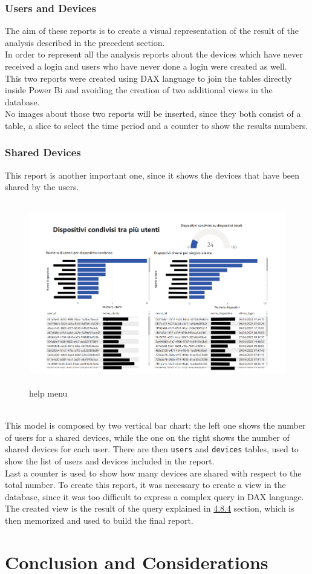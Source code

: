 \documentclass[12pt, a4paper, oneside]{article}
\begin{document}
\subsubsection{Users and Devices}
The aim of these reports is to create a visual representation of the result of the analysis described in the precedent section. \\
In order to represent all the analysis reports about the devices which have never received a login and users who have never done a login were created as well.\\
This two reports were created using DAX language to join the tables directly inside Power Bi and avoiding the creation of two additional views in the database.\\
No images about those two reports will be inserted, since they both consist of a table, a slice to select the time period and a counter to show the results numbers.

\subsubsection{Shared Devices}
This report is another important one, since it shows the devices that have been shared by the users.
\begin{figure}[h]
    \centering
    \includegraphics[width=\textwidth, height=8cm]{shared-devices.png}
    \caption{help menu}
\end{figure}\\
This model is composed by two vertical bar chart: the left one shows the number of users for a shared devices, while the one on the right shows the number of shared devices for each user.
There are then \texttt{users} and \texttt{devices} tables, used to show the list of users and devices included in the report. \\
Last a counter is used to show how many devices are shared with respect to the total number.
To create this report, it was necessary to create a view in the database, since it was too difficult to express a complex query in DAX language. The created view is the result of the query explained in 
\href{subsubsec:shared}{4.8.4} section, which is then memorized and used to build the final report.









\section{Conclusion and Considerations}
\end{document}
